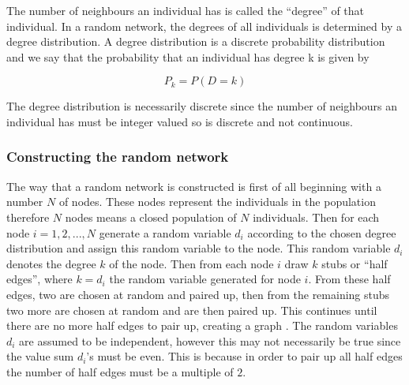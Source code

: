 \documentclass{uonmathsreport}
\begin{document}
The number of neighbours an individual has is called the “degree” of that individual. In a random network, the degrees of all individuals is determined by a degree distribution. A degree distribution is a discrete probability distribution and we say that the probability that an individual has degree k is given by 

\begin{equation}
P_k = P(D=k)
\end{equation}

\noindent
The degree distribution is necessarily discrete since the number of neighbours an individual has must be integer valued so is discrete and not continuous.


\subsubsection{Constructing the random network} \label{subsub:5.1.2}

The way that a random network is constructed is first of all beginning with a number $N$ of nodes. These nodes represent the individuals in the population therefore $N$ nodes means a closed population of $N$ individuals. Then for each node $i=1,2,...,N$ generate a random variable $d_i$ according to the chosen degree distribution and assign this random variable to the node. This random variable $d_i$ denotes the degree $k$ of the node. Then from each node $i$ draw $k$ stubs or ``half edges”, where $k=d_i$ the random variable generated for node $i$. From these half edges, two are chosen at random and paired up, then from the remaining stubs two more are chosen at random and are then paired up. This continues until there are no more half edges to pair up, creating a graph \cite{bibbollobas}. The random variables $d_i$ are assumed to be independent, however this may not necessarily be true since the value sum $d_i$’s must be even. This is because in order to pair up all half edges the number of half edges must be a multiple of $2$. 
\end{document}
